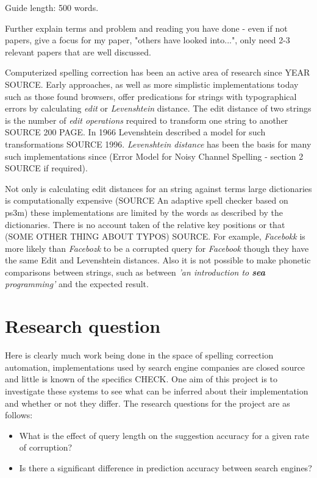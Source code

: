 \documentclass{csfourzero}
\begin{document}
Guide length: 500 words.

Further explain terms and problem and reading you have done - even if not papers, give a focus for my paper, "others have looked into...", only need 2-3 relevant papers that are well discussed.

Computerized spelling correction has been an active area of research since YEAR SOURCE. Early approaches, as well as more simplistic implementations today such as those found browsers, offer predications for strings with typographical errors by calculating \textit{edit} or \textit{Levenshtein } distance. The edit distance of two strings is the number of \textit{edit operations} required to transform one string to another SOURCE 200 PAGE. In 1966 Levenshtein described a model for such transformations SOURCE 1996. \textit{Levenshtein distance} has been the basis for many such implementations since (Error Model for Noisy Channel Spelling - section 2 SOURCE if required).

Not only is calculating edit distances for an string against terms large dictionaries is computationally expensive (SOURCE An adaptive spell checker based on ps3m) these implementations are limited by the words as described by the dictionaries. There is no account taken of the relative key positions or that (SOME OTHER THING ABOUT TYPOS) SOURCE. For example, \textit{Facebokk} is more likely than \textit{Facebozk} to be a corrupted query for \textit{Facebook} though they have the same Edit and Levenshtein distances. Also it is not possible to make phonetic comparisons between strings, such as between \textit{'an introduction to \textbf{sea} programming'} and the expected result.


\section{Research question}
\label{sec:rq}

Here is clearly much work being done in the space of spelling correction automation, implementations used by search engine companies are closed source and little is known of the specifics CHECK. One aim of this project is to investigate these systems to see what can be inferred about their implementation and whether or not they differ. The research questions for the project are as follows:

\begin{itemize}
  \item{What is the effect of query length on the suggestion accuracy for a given rate of corruption?}
  \item{Is there a significant difference in prediction accuracy between search engines?}
\end{itemize}
\end{document}
